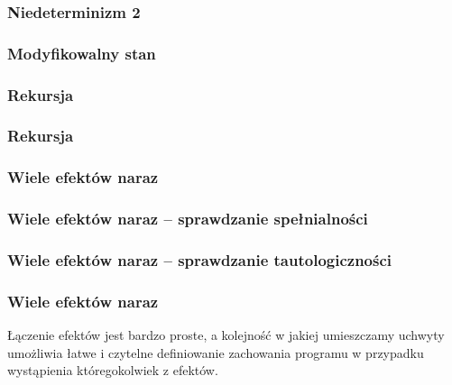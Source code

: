 \begin{frame}
  \frametitle{Niedeterminizm 2}
  
\end{frame}

\begin{frame}
  \frametitle{Modyfikowalny stan}
  
  
\end{frame}

\begin{frame}
  \frametitle{Rekursja}
  
  \vspace{2em}
  
\end{frame}

\begin{frame}
  \frametitle{Rekursja}
  
\end{frame}

\begin{frame}
  \frametitle{Wiele efektów naraz}
  
\end{frame}

\begin{frame}
  \frametitle{Wiele efektów naraz -- sprawdzanie spełnialności}
  
\end{frame}

\begin{frame}
  \frametitle{Wiele efektów naraz -- sprawdzanie tautologiczności}
  
\end{frame}

\begin{frame}
  \frametitle{Wiele efektów naraz}
  Łączenie efektów jest bardzo proste, a kolejność w jakiej umieszczamy uchwyty umożliwia łatwe i czytelne definiowanie zachowania programu w przypadku wystąpienia któregokolwiek z efektów.
\end{frame}
